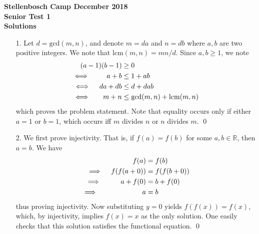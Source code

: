 \documentclass[a4paper, 12pt]{article}
\begin{document}
\begin{center}
\textbf{Stellenbosch Camp December 2018 \\ Senior Test 1} \\
\textbf{Solutions}
\end{center}
\vspace{5mm}

\begin{enumerate}

    \item[1.] Let $d = \textrm{gcd}(m, n)$, and denote $m = da$ and $n = db$ where $a, b$ are two positive integers. We note that $\textrm{lcm}(m, n) = mn/d$. Since $a, b \geq 1$, we note
    \begin{align*}
        (a-1)(b-1) &\geq 0 \\
        \iff \quad \hspace{4.2mm} a + b &\leq 1 + ab \\
        \iff \quad da + db &\leq d + dab \\
        \iff \quad \hspace{2mm} m + n &\leq \textrm{gcd}(m, n) + \textrm{lcm}(m, n) 
    \end{align*}
    which proves the problem statement. Note that equality occurs only if either $a = 1$ or $b = 1$, which occurs iff $m$ divides $n$ or $n$ divides $m$. \qed \\
    \vspace{5mm}
    
    \item[2.] We first prove injectivity. That is, if $f(a) = f(b)$ for some $a, b \in \mathbb{R}$, then $a = b$. We have
    \begin{align*}
        f(a) &= f(b) \\
        \implies \quad f(f(a + 0)) &= f(f(b + 0)) \\
        \implies \quad \hspace{5.5mm} a + f(0) &= b + f(0) \\
        \implies \quad \hspace{18mm} a &= b 
    \end{align*}
    thus proving injectivity. Now substituting $y = 0$ yields $f(f(x)) = f(x)$, which, by injectivity, implies $f(x) = x$ as the only solution. One easily checks that this solution satisfies the functional equation. \qed \\
    \vspace{5mm}
    

\end{enumerate}
\end{document}
